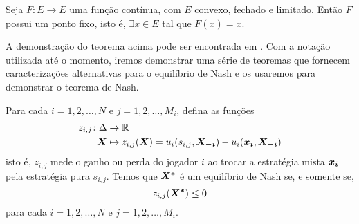 \begin{theorem}
\label{teoPontoFixo}
    Seja $F:E\to E$ uma função contínua, com $E$ convexo, fechado e limitado. Então $F$ possui um ponto fixo, isto é, $\exists x\in E$ tal que $F(x)=x$.
\end{theorem}

A demonstração do teorema acima pode ser encontrada em \cite{starr_2011}. Com a notação utilizada até o momento, iremos demonstrar uma série de teoremas \cite{sartini2004introduccao} que fornecem caracterizações alternativas para o equilíbrio de Nash e os usaremos para demonstrar o teorema de Nash.

\begin{theorem}
    Para cada $i=1,2,\dots,N$ e $j=1,2,\dots,M_i$, defina as funções
    \begin{align*}
        \begin{split}
            z_{i,j} \colon \Delta &\to \mathbb{R}\\
            \boldsymbol{X} &\mapsto z_{i,j}(\boldsymbol{X})=u_i(s_{i,j},\boldsymbol{X_{-i}})-u_i(\boldsymbol{x_i},\boldsymbol{X_{-i}})
        \end{split}
    \end{align*}
    isto é, $z_{i,j}$ mede o ganho ou perda do jogador $i$ ao trocar a estratégia mista $\boldsymbol{x_i}$ pela estratégia pura $s_{i,j}$. Temos que $\boldsymbol{X^*}$ é um equilíbrio de Nash se, e somente se,
    \begin{equation*}
        z_{i,j}(\boldsymbol{X^*})\leq 0
    \end{equation*}
    para cada $i=1,2,\dots,N$ e $j=1,2,\dots,M_i$.
\end{theorem}
